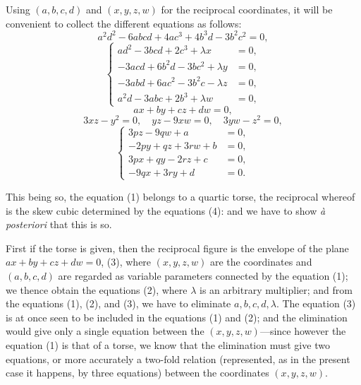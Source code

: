 \documentclass[11pt]{article}
\begin{document}
Using $(a,b,c,d)$ and $(x,y,z,w)$ for the reciprocal coordinates, it will be convenient to collect the different equations as follows:
\begin{equation}
a^2 d^2 - 6abcd + 4ac^3 + 4b^3 d - 3b^2 c^2 = 0,
\end{equation}
\begin{equation}
\left\{\begin{aligned}
ad^2 - 3bcd + 2c^3 + \lambda x &= 0,\\
-3acd + 6b^2 d - 3bc^2 + \lambda y &= 0,\\
-3abd + 6ac^2 - 3b^2 c - \lambda z &= 0,\\
a^2 d - 3abc + 2b^3 + \lambda w &= 0,
\end{aligned}\right.
\end{equation}
\begin{equation}
ax + by + cz + dw = 0,
\end{equation}
\begin{equation}
3xz - y^2 = 0,\quad yz - 9xw = 0,\quad 3yw - z^2 = 0,
\end{equation}
\begin{equation}
\left\{\begin{aligned}
3pz - 9qw + a &= 0,\\
-2py + qz + 3rw + b &= 0,\\
3px + qy - 2rz + c &= 0,\\
-9qx + 3ry + d &= 0.
\end{aligned}\right.
\end{equation}

This being so, the equation (1) belongs to a quartic torse, the reciprocal whereof is the skew cubic determined by the equations (4): and we have to show \emph{\`a posteriori} that this is so.

First if the torse is given, then the reciprocal figure is the envelope of the plane $ax + by + cz + dw = 0$, (3), where $(x,y,z,w)$ are the coordinates and $(a,b,c,d)$ are regarded as variable parameters connected by the equation (1); we thence obtain the equations (2), where $\lambda$ is an arbitrary multiplier; and from the equations (1), (2), and (3), we have to eliminate $a,b,c,d,\lambda$. The equation (3) is at once seen to be included in the equations (1) and (2); and the elimination would give only a single equation between the $(x,y,z,w)$---since however the equation (1) is that of a torse, we know that the elimination must give two equations, or more accurately a two-fold relation (represented, as in the present case it happens, by three equations) between the coordinates $(x,y,z,w)$.
\end{document}
